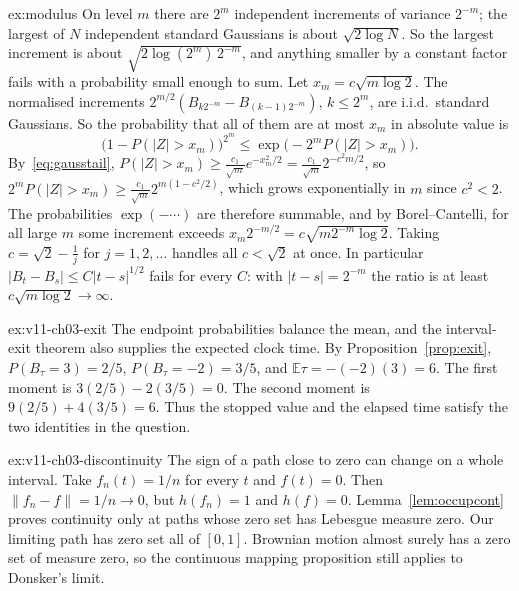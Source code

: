 \begin{solution}{ex:modulus}
\idea On level $m$ there are $2^m$ independent increments of variance $2^{-m}$; the largest of $N$ independent standard Gaussians is about $\sqrt{2\log N}$. So the largest increment is
about $\sqrt{2\log(2^m)\,2^{-m}}$, and anything smaller by a constant factor fails with a probability small enough to sum.
\writeup Let $x_m=c\sqrt{m\log2}$. The normalised increments $2^{m/2}(B_{k2^{-m}}-B_{(k-1)2^{-m}})$, $k\le2^m$, are i.i.d.\ standard Gaussians. So the probability that all of them are at most
$x_m$ in absolute value is
\[
\bigl(1-P(|Z|>x_m)\bigr)^{2^m}\le\exp\bigl(-2^mP(|Z|>x_m)\bigr).
\]
By~\eqref{eq:gausstail}, $P(|Z|>x_m)\ge\frac{c_1}{\sqrt m}e^{-x_m^2/2}=\frac{c_1}{\sqrt m}2^{-c^2m/2}$, so $2^mP(|Z|>x_m)\ge\frac{c_1}{\sqrt m}2^{m(1-c^2/2)}$, which grows exponentially in
$m$ since $c^2<2$. The probabilities $\exp(-\cdots)$ are therefore summable, and by Borel--Cantelli, for all large $m$ some increment exceeds $x_m2^{-m/2}=c\sqrt{m2^{-m}\log2}$. Taking
$c=\sqrt2-\frac1j$ for $j=1,2,\dots$ handles all $c<\sqrt2$ at once. In particular $|B_t-B_s|\le C|t-s|^{1/2}$ fails for every $C$: with $|t-s|=2^{-m}$ the ratio is at least
$c\sqrt{m\log2}\to\infty$.
\end{solution}

\begin{solution}{ex:v11-ch03-exit}
\idea The endpoint probabilities balance the mean, and the interval-exit theorem also supplies the expected clock time.
\writeup By Proposition~\ref{prop:exit}, $P(B_\tau=3)=2/5$, $P(B_\tau=-2)=3/5$, and $\mathbb E\tau=-(-2)(3)=6$. The first moment is $3(2/5)-2(3/5)=0$. The second moment is $9(2/5)+4(3/5)=6$. Thus the stopped value and the elapsed time satisfy the two identities in the question.
\end{solution}

\begin{solution}{ex:v11-ch03-discontinuity}
\idea The sign of a path close to zero can change on a whole interval.
\writeup Take $f_n(t)=1/n$ for every $t$ and $f(t)=0$. Then $\|f_n-f\|=1/n\to0$, but $h(f_n)=1$ and $h(f)=0$. Lemma~\ref{lem:occupcont} proves continuity only at paths whose zero set has Lebesgue measure zero. Our limiting path has zero set all of $[0,1]$. Brownian motion almost surely has a zero set of measure zero, so the continuous mapping proposition still applies to Donsker's limit.
\end{solution}

